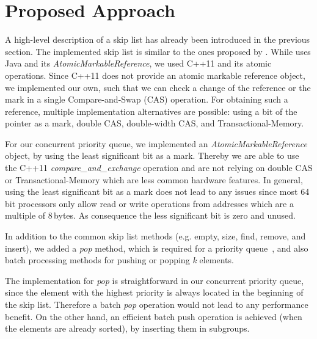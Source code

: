 \section{Proposed Approach}\label{sec:approach}
A high-level description of a skip list has already been introduced in the previous section. The implemented skip list is similar to the ones proposed by \cite{Herlihy:2008:AMP:1734069, Sundell:2005:FLC:1073765.1073770}. While \cite{Herlihy:2008:AMP:1734069} uses Java and its \textit{AtomicMarkableReference}, we used C++11 and its atomic operations. Since C++11 does not provide an atomic markable reference object, we implemented our own, such that we can check a change of the reference or the mark in a single Compare-and-Swap (CAS) operation. For obtaining such a reference, multiple implementation alternatives are possible: using a bit of the pointer as a mark, double CAS, double-width CAS, and Transactional-Memory.

For our concurrent priority queue, we implemented an \textit{AtomicMarkableReference} object, by using the least significant bit as a mark. Thereby we are able to use the C++11 {\em compare\_and\_exchange} operation and are not relying on double CAS or Transactional-Memory which are less common hardware features.
In general, using the least significant bit as a mark does not lead to any issues since most 64\,bit processors only allow read or write operations from addresses which are a multiple of 8\,bytes.
As consequence the less significant bit is zero and unused.

In addition to the common skip list methods (e.g. empty, size, find, remove, and insert), we added a \textit{pop} method, which is required for a priority queue~\cite{Herlihy:2008:AMP:1734069}, and also batch processing methods for pushing or popping \textit{k} elements.

The implementation for \textit{pop} is straightforward in our concurrent priority queue, since the element with the highest priority is always located in the beginning of the skip list.
Therefore a batch \textit{pop} operation would not lead to any performance benefit.
 On the other hand, an efficient batch push operation is achieved (when the elements are already sorted), by inserting them in subgroups.


